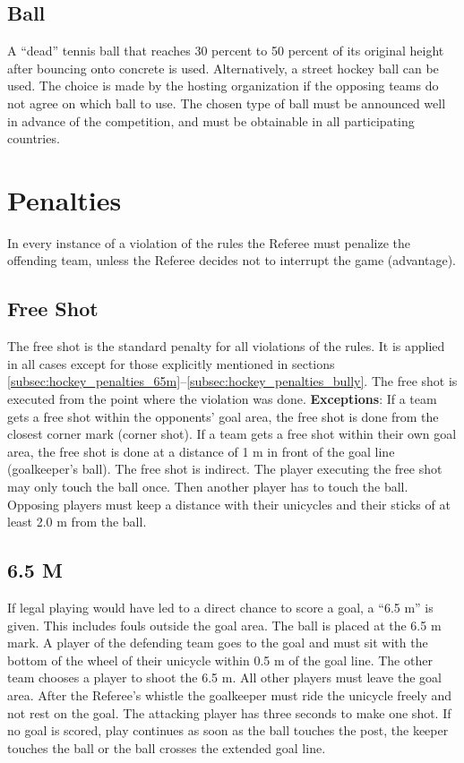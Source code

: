\subsection{Ball}
A ``dead'' tennis ball that reaches 30 percent to 50 percent of its original height after bouncing onto concrete is used.
Alternatively, a street hockey ball can be used.
The choice is made by the hosting organization if the opposing teams do not agree on which ball to use.
The chosen type of ball must be announced well in advance of the competition, and must be obtainable in all participating countries.

\section{Penalties}
In every instance of a violation of the rules the Referee must penalize the offending team, unless the Referee decides not to interrupt the game (advantage).

\subsection{Free Shot}
The free shot is the standard penalty for all violations of the rules.
It is applied in all cases except for those explicitly mentioned in sections \ref{subsec:hockey_penalties_65m}–\ref{subsec:hockey_penalties_bully}.
The free shot is executed from the point where the violation was done.
\textbf{Exceptions}: If a team gets a free shot within the opponents' goal area, the free shot is done from the closest corner mark (corner shot).
If a team gets a free shot within their own goal area, the free shot is done at a distance of 1 m in front of the goal line (goalkeeper's ball).
The free shot is indirect.
The player executing the free shot may only touch the ball once.
Then another player has to touch the ball.
Opposing players must keep a distance with their unicycles and their sticks of at least 2.0 m from the ball.

\subsection{6.5 M \label{subsec:hockey_penalties_65m}}
If legal playing would have led to a direct chance to score a goal, a ``6.5 m'' is given.
This includes fouls outside the goal area.
The ball is placed at the 6.5 m mark.
A player of the defending team goes to the goal and must sit with the bottom of the wheel of their unicycle within 0.5 m of the goal line.
The other team chooses a player to shoot the 6.5 m.
All other players must leave the goal area.
After the Referee's whistle the goalkeeper must ride the unicycle freely and not rest on the goal.
The attacking player has three seconds to make one shot.
If no goal is scored, play continues as soon as the ball touches the post, the keeper touches the ball or the ball crosses the extended goal line.

